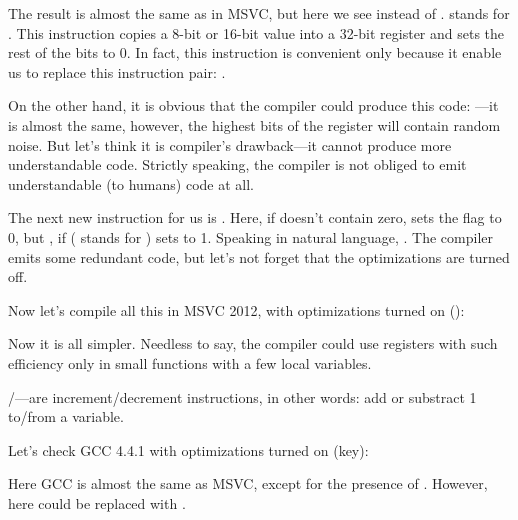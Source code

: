 \label{movzx}

The result is almost the same as in MSVC, but here we see \MOVZX instead of \MOVSX. 
\MOVZX stands for . 
This instruction copies a 8-bit or 16-bit value into a 32-bit register and sets the rest of the bits to 0. 
In fact, this instruction is convenient only because it enable us to replace this instruction pair: 
.

On the other hand, it is obvious that the compiler could produce this code: 
---it is almost the same, however, 
the highest bits of the \EAX register will contain random noise. 
But let's think it is compiler's drawback---it cannot produce more understandable code. 
Strictly speaking, the compiler is not obliged to emit understandable (to humans) code at all.


The next new instruction for us is \SETNZ. 
Here, if \AL doesn't contain zero,  
sets the \ZF flag to 0, but \SETNZ, if  ( stands for ) sets \AL to 1.
Speaking in natural language, . 
The compiler emits some redundant code, but let's not forget that the optimizations are turned off.

\label{strlen_MSVC_Ox}

Now let's compile all this in MSVC 2012, with optimizations turned on (\Ox):



Now it is all simpler.
Needless to say, the compiler could use registers with such efficiency
only in small functions with a few local variables.

\INC/\DEC---are \gls{increment}/\gls{decrement} instructions, in other words: add or substract 1 to/from a variable.




Let's check GCC 4.4.1 with optimizations turned on (\Othree key):


 
Here GCC is almost the same as MSVC, except for the presence of \MOVZX.
However, here \MOVZX could be replaced with .

